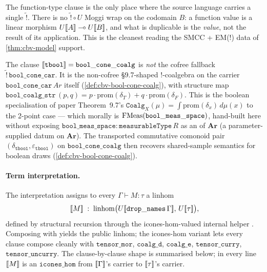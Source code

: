 The function-type clause is the only place where the source language
carries a single $\widetilde{\mathord{!}}$. There is no
$\widetilde{\mathord{!}} \circ U$ Moggi wrap on the codomain $B$: a
function value is a linear morphism
$U[\![ A ]\!] \multimap U[\![ B ]\!]$, and what is duplicable is the
\emph{value}, not the result of its application. This is the cleanest
reading the SMCC + EM(!) data of \autoref{thm:cbv-model} support.

\begin{remark}\label{rem:cbv-tbool}
The clause $[\![ \mathtt{tbool} ]\!] = \mathtt{bool\_cone\_coalg}$ is
\emph{not} the cofree fallback
$\widetilde{\mathord{!}}\,\mathtt{bool\_cone\_car}$. It is the
non-cofree \S9.7-shaped $\mathord{!}$-coalgebra
 on the
carrier $\mathtt{bool\_cone\_car}\,Ar$ itself
(\autoref{def:cbv-bool-cone-coalg}), with structure map
$\mathtt{bool\_coalg\_str}\,(p, q) =
p \cdot \mathrm{prom}(\delta_T) + q \cdot \mathrm{prom}(\delta_F)$.
This is the boolean specialisation of paper Theorem~9.7's
$\mathtt{Coalg}_X(\mu) = \int \mathrm{prom}(\delta_x)\,d\mu(x)$ to the
2-point case --- which morally is
$\mathrm{FMeas}(\mathtt{bool\_meas\_space})$, hand-built here without
exposing $\mathtt{bool\_meas\_space} : \mathtt{measurableType}\,R$ as an
 of $\mathbf{Ar}$ (a parameter-supplied
datum on $\mathbf{Ar}$). The transported commutative comonoid pair
$(\delta_{\mathtt{tbool}}, \varepsilon_{\mathtt{tbool}})$ on
$\mathtt{bool\_cone\_coalg}$ then recovers shared-sample semantics for
boolean draws (\autoref{def:cbv-bool-cone-coalg}).
\end{remark}

\paragraph{Term interpretation.}
The interpretation  assigns to every
$\Gamma \vdash M : \tau$ a linhom
\[
  [\![ M ]\!]
  \;:\;
  \mathrm{linhom}\bigl(U[\![ \mathtt{drop\_names}\,\Gamma ]\!],\,U[\![ \tau ]\!]\bigr),
\]
defined by structural recursion through the icones-hom-valued internal
helper . Composing with
 yields the public linhom; the
icones-hom variant lets every clause compose cleanly with
$\mathtt{tensor\_mor}$, $\mathtt{coalg\_d}$, $\mathtt{coalg\_e}$,
$\mathtt{tensor\_curry}$, $\mathtt{tensor\_uncurry}$. The
clause-by-clause shape is summarised below; in every line $[\![ M ]\!]$ is
an $\mathtt{icones\_hom}$ from $[\![ \Gamma ]\!]$'s carrier to
$[\![ \tau ]\!]$'s carrier.

